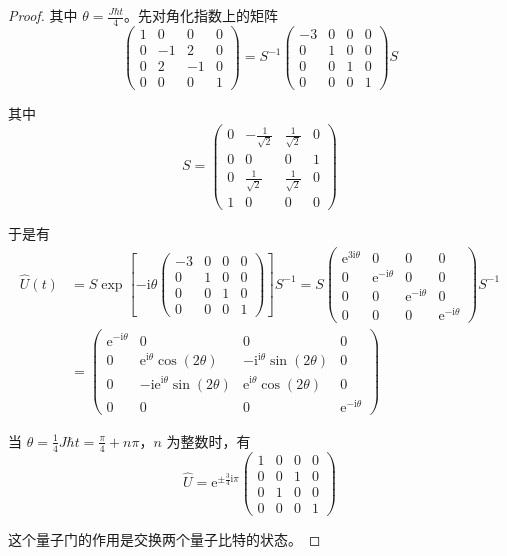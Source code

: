 \begin{proof}
其中 $\theta=\frac{J \hbar t}{4}$。先对角化指数上的矩阵
$$\begin{pmatrix}
1 & 0 & 0 & 0 \\
0 & -1 & 2 & 0 \\
0 & 2 & -1 & 0 \\
0 & 0 & 0 & 1
\end{pmatrix}=S^{-1}\begin{pmatrix}
-3 & 0 & 0 & 0 \\
0 & 1 & 0 & 0 \\
0 & 0 & 1 & 0 \\
0 & 0 & 0 & 1
\end{pmatrix} S$$

其中
$$S=\begin{pmatrix}
0 & -\frac{1}{\sqrt{2}} & \frac{1}{\sqrt{2}} & 0 \\
0 & 0 & 0 & 1 \\
0 & \frac{1}{\sqrt{2}} & \frac{1}{\sqrt{2}} & 0 \\
1 & 0 & 0 & 0
\end{pmatrix}$$

于是有
$$\begin{aligned}
\hat{U}(t) & =S \exp \left[-\mathrm{i} \theta\begin{pmatrix}
-3 & 0 & 0 & 0 \\
0 & 1 & 0 & 0 \\
0 & 0 & 1 & 0 \\
0 & 0 & 0 & 1
\end{pmatrix}\right] S^{-1}=S\begin{pmatrix}
\mathrm{e}^{\mathrm{3i} \theta} & 0 & 0 & 0 \\
0 & \mathrm{e}^{-\mathrm{i} \theta} & 0 & 0 \\
0 & 0 & \mathrm{e}^{-\mathrm{i} \theta} & 0 \\
0 & 0 & 0 & \mathrm{e}^{-\mathrm{i} \theta}
\end{pmatrix} S^{-1} \\
& =\begin{pmatrix}
\mathrm{e}^{-\mathrm{i} \theta} & 0 & 0 & 0 \\
0 & \mathrm{e}^{\mathrm{i} \theta} \cos (2 \theta) & -\mathrm{i}^{\mathrm{i} \theta} \sin (2 \theta) & 0 \\
0 & -\mathrm{ie}^{\mathrm{i} \theta} \sin (2 \theta) & \mathrm{e}^{\mathrm{i} \theta} \cos (2 \theta) & 0 \\
0 & 0 & 0 & \mathrm{e}^{-\mathrm{i} \theta}
\end{pmatrix}
\end{aligned}$$

当 $\theta=\frac{1}{4} J \hbar t=\frac{\pi}{4}+n \pi$，$n$ 为整数时，有
$$\hat{U}=\mathrm{e}^{\pm \frac{3}{4} \mathrm{i} \pi}\begin{pmatrix}
1 & 0 & 0 & 0 \\
0 & 0 & 1 & 0 \\
0 & 1 & 0 & 0 \\
0 & 0 & 0 & 1
\end{pmatrix}$$

这个量子门的作用是交换两个量子比特的状态。
\end{proof}